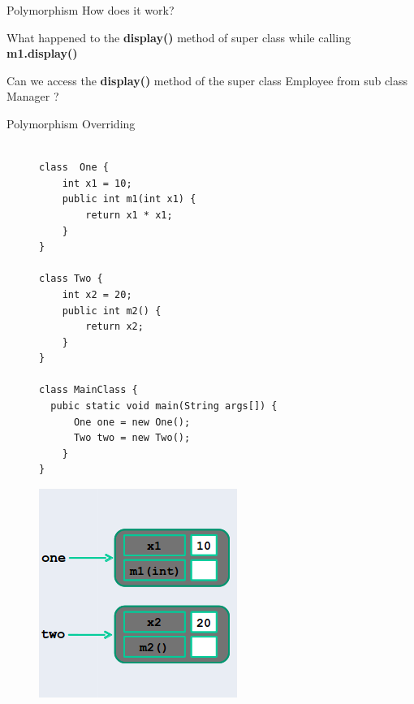 \documentclass[14pt]{beamer}
\begin{document}
\begin{frame}{Polymorphism}
 How does it work?
 \vspace{1pc}
 
 What happened to the \textbf{display()} method of super class while calling \textbf{m1.display()}
 \vspace{1pc}
 
 Can we access the \textbf{display()} method of the super class Employee from sub class Manager ?
\end{frame}

\begin{frame}[fragile]{Polymorphism}
 Overriding
 
 \begin{figure}[H]
\begin{minipage}[l]{0.5\linewidth}
\begin{lstlisting}[numbers=none, basicstyle=\tiny]

class  One {
    int x1 = 10;
    public int m1(int x1) {
        return x1 * x1;
    }
}

class Two {
    int x2 = 20;
    public int m2() {
        return x2;
    }
}

class MainClass {
  pubic static void main(String args[]) {
      One one = new One();
      Two two = new Two();
    }
}
\end{lstlisting}

\end{minipage}
\quad
\begin{minipage}[c]{0.3\textwidth}
\includegraphics[scale=.4]{poly-program.png}

\end{minipage}
\end{figure}
\end{frame}
\end{document}
